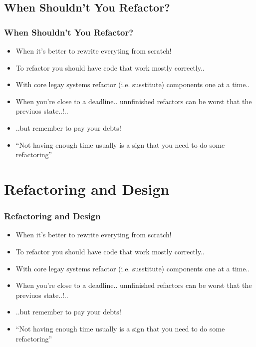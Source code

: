 \documentclass{beamer}
\begin{document}
\subsection{When Shouldn't You Refactor?}
\begin{frame}
  \frametitle{When Shouldn't You Refactor?} 
  \begin{itemize}
  		\item<+-> When it's better to rewrite everyting from scratch!
  		\item<+-> To refactor you should have code that work mostly correctly..
  		\item<+-> With core legay systems refactor (i.e. susstitute) components one at a time..
  		\item<+-> When you're close to a deadline.. unnfinished refactors can be worst that the previuos state..!..
  		\item<+-> ..but remember to pay your debts!
  		\item<+-> ``Not having enough time usually is a sign that you need to do some refactoring''
  \end{itemize}
\end{frame}

\section{Refactoring and Design}
\begin{frame}
  \frametitle{Refactoring and Design} 
  \begin{itemize}
  		\item<+-> When it's better to rewrite everyting from scratch!
  		\item<+-> To refactor you should have code that work mostly correctly..
  		\item<+-> With core legay systems refactor (i.e. susstitute) components one at a time..
  		\item<+-> When you're close to a deadline.. unnfinished refactors can be worst that the previuos state..!..
  		\item<+-> ..but remember to pay your debts!
  		\item<+-> ``Not having enough time usually is a sign that you need to do some refactoring''
  \end{itemize}
\end{frame}
\end{document}

